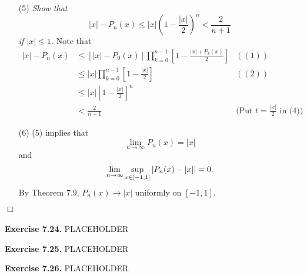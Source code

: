 \documentclass{article}
\begin{document}
\begin{enumerate}
\item[(5)]
\emph{Show that
\[
  |x| - P_n(x) \leq |x| \left(1-\frac{|x|}{2}\right)^n < \frac{2}{n+1}
\]
if $|x| \leq 1$.}
Note that
\begin{align*}
  |x| - P_n(x)
  &\leq [ |x| - P_0(x) ] \prod_{k=0}^{n-1}\left[1-\frac{|x|+P_k(x)}{2}\right]
    & ((1)) \\
  &\leq |x| \prod_{k=0}^{n-1}\left[1-\frac{|x|}{2}\right]
    & ((2)) \\
  &\leq |x| \left[1-\frac{|x|}{2}\right]^n \\
  & < \frac{2}{n+1}
    & \text{(Put $t=\frac{|x|}{2}$ in (4))}.
\end{align*}

\item[(6)]
(5) implies that
\[
  \lim_{n \to \infty} P_n(x) = |x|
\]
and
\[
  \lim_{n \to \infty} \sup_{x \in [-1,1]}\abs{ P_n(x) - |x| } = 0.
\]
By Theorem 7.9, $P_n(x) \to |x|$ uniformly on $[-1,1]$.
\end{enumerate}
$\Box$ \\\\






\textbf{Exercise 7.24.}
PLACEHOLDER






\textbf{Exercise 7.25.}
PLACEHOLDER






\textbf{Exercise 7.26.}
PLACEHOLDER



\end{document}
